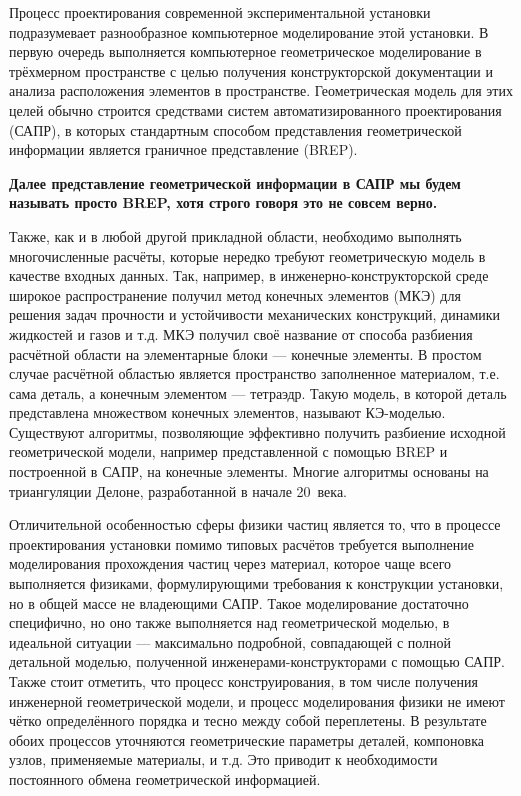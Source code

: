 Процесс проектирования современной экспериментальной установки подразумевает разнообразное компьютерное моделирование этой установки. В первую очередь выполняется компьютерное геометрическое моделирование в трёхмерном пространстве с целью получения конструкторской документации и анализа расположения элементов в пространстве. Геометрическая модель для этих целей обычно строится средствами систем автоматизированного проектирования (САПР), в которых стандартным способом представления геометрической информации является граничное представление (BREP).

\textbf{Далее представление геометрической информации в САПР мы будем называть просто BREP, хотя строго говоря это не совсем верно.}

Также, как и в любой другой прикладной области, необходимо выполнять многочисленные расчёты, которые нередко требуют геометрическую модель в качестве входных данных. Так, например, в инженерно-конструкторской среде широкое распространение получил метод конечных элементов (МКЭ) для решения задач прочности и устойчивости механических конструкций, динамики жидкостей и газов и т.д. МКЭ получил своё название от способа разбиения расчётной области на элементарные блоки --- конечные элементы. В простом случае расчётной областью является пространство заполненное материалом, т.е. сама деталь, а конечным элементом --- тетраэдр. Такую модель, в которой деталь представлена множеством конечных элементов, называют КЭ-моделью. Существуют алгоритмы, позволяющие эффективно получить разбиение исходной геометрической модели, например представленной с помощью BREP и построенной в САПР, на конечные элементы. Многие алгоритмы основаны на триангуляции Делоне, разработанной в начале 20~века.

Отличительной особенностью сферы физики частиц является то, что в процессе проектирования установки помимо типовых расчётов требуется выполнение моделирования прохождения частиц через материал, которое чаще всего выполняется физиками, формулирующими требования к конструкции установки, но в общей массе не владеющими САПР. Такое моделирование достаточно специфично, но оно также выполняется над геометрической моделью, в идеальной ситуации --- максимально подробной, совпадающей с полной детальной моделью, полученной инженерами-конструкторами с помощью САПР. Также стоит отметить, что процесс конструирования, в том числе получения инженерной геометрической модели, и процесс моделирования физики не имеют чётко определённого порядка и тесно между собой переплетены. В результате обоих процессов уточняются геометрические параметры деталей, компоновка узлов, применяемые материалы, и т.д. Это приводит к необходимости постоянного обмена геометрической информацией.

